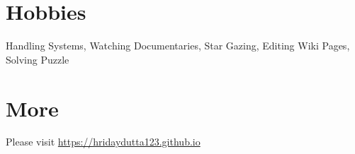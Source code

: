 \documentclass[margin, centered]{res}
\begin{document}
\begin{resume}

\section{Hobbies}
Handling Systems, Watching Documentaries, Star Gazing, Editing Wiki Pages, Solving Puzzle

\section{More}
Please visit \href{https://hridaydutta123.github.io}{https://hridaydutta123.github.io}

\end{resume}
\end{document}
